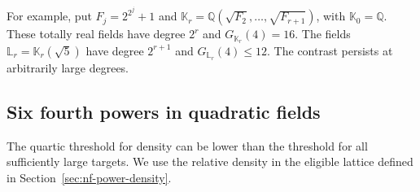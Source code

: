 \documentclass[11pt,letterpaper]{article}
\theoremstyle{definition}
\numberwithin{equation}{section}
\begin{document}
For example, put $F_j=2^{2^j}+1$ and
$\mathbb K_r=\mathbb Q(\sqrt{F_2},\ldots,\sqrt{F_{r+1}})$, with
$\mathbb K_0=\mathbb Q$. These totally real fields have degree $2^r$
and $G_{\mathbb K_r}(4)=16$. The fields $\mathbb L_r=\mathbb K_r(\sqrt5)$ have degree
$2^{r+1}$ and $G_{\mathbb L_r}(4)\le12$. The contrast persists at
arbitrarily large degrees.

\subsection{Six fourth powers in quadratic fields}
\label{sec:nf-quartic-density}
The quartic threshold for density can be lower than the threshold
for all sufficiently large targets. We use the relative density in
the eligible lattice defined in Section~\ref{sec:nf-power-density}.
\end{document}
